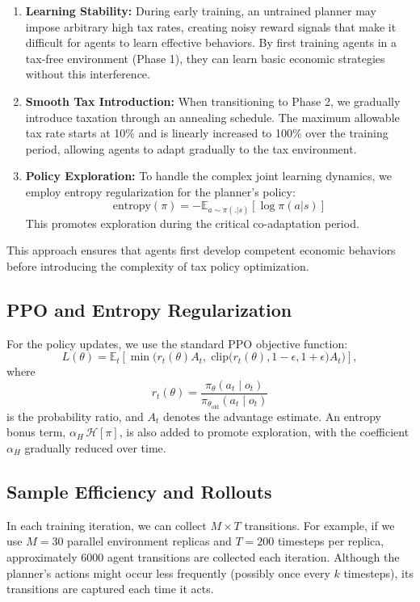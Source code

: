 \begin{enumerate}
    \item \textbf{Learning Stability:} During early training, an untrained planner may impose arbitrary high tax rates, creating noisy reward signals that make it difficult for agents to learn effective behaviors. By first training agents in a tax-free environment (Phase 1), they can learn basic economic strategies without this interference.
    
    \item \textbf{Smooth Tax Introduction:} When transitioning to Phase 2, we gradually introduce taxation through an annealing schedule. The maximum allowable tax rate starts at 10\% and is linearly increased to 100\% over the training period, allowing agents to adapt gradually to the tax environment.
    
    \item \textbf{Policy Exploration:} To handle the complex joint learning dynamics, we employ entropy regularization for the planner's policy:
    \[
    \text{entropy}(\pi) = -\mathbb{E}_{a\sim\pi(.|s)}[\log \pi(a|s)]
    \]
    This promotes exploration during the critical co-adaptation period.
\end{enumerate}

This approach ensures that agents first develop competent economic behaviors before introducing the complexity of tax policy optimization.


\subsection{PPO and Entropy Regularization}

For the policy updates, we use the standard PPO objective function:
\[
L(\theta) = \mathbb{E}_t\left[\min\Big(r_t(\theta) A_t,\; \mathrm{clip}\big(r_t(\theta), 1-\epsilon, 1+\epsilon\big) A_t\Big)\right],
\]
where
\[
r_t(\theta) = \frac{\pi_\theta(a_t \mid o_t)}{\pi_{\theta_{\text{old}}}(a_t \mid o_t)}
\]
is the probability ratio, and \(A_t\) denotes the advantage estimate. An entropy bonus term, \(\alpha_H \,\mathcal{H}[\pi]\), is also added to promote exploration, with the coefficient \(\alpha_H\) gradually reduced over time.

\subsection{Sample Efficiency and Rollouts}

In each training iteration, we can collect \(M \times T\) transitions. For example, if we use \(M = 30\) parallel environment replicas and \(T = 200\) timesteps per replica, approximately 6000 agent transitions are collected each iteration. Although the planner’s actions might occur less frequently (possibly once every \(k\) timesteps), its transitions are captured each time it acts.
